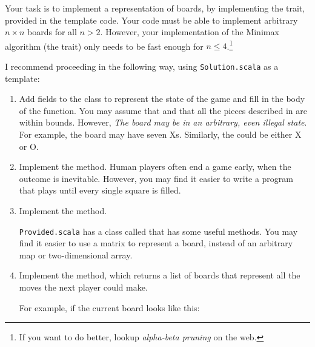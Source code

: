 \documentclass{book}
\begin{document}
Your task is to implement a representation of boards, by implementing
the  trait, provided in the template code.
Your code must be able to implement arbitrary $n \times n$ boards for
all $n > 2$. However, your implementation of the Minimax algorithm
(the  trait) only needs to be fast enough for
 $n \le 4$.\footnote{If you want to do better, lookup \emph{alpha-beta pruning} on the web.}

I recommend proceeding in the following way, using
\texttt{Solution.scala} as a template:

\begin{enumerate}

\item
   Add fields to the  class to represent the state of the game and
   fill in the body of the  function.
   You may assume that  and that all the pieces described
   in  are within bounds. However, \emph{The board may be in an
   arbitrary, even illegal state}. For example, the board may have seven Xs.
   Similarly, the  could be either X or O.


\item Implement the  method. Human players often end a game early,
   when the outcome is inevitable. However, you may find it easier to write a
   program that plays until every single square is filled.


\item Implement the  method.

   \texttt{Provided.scala} has a class called  that
   has some useful methods. You may find it easier to use a matrix to represent
   a board, instead of an arbitrary map or two-dimensional array.

\item Implement the  method, which returns a list of
   boards that represent all the moves the next player could make.

   For example, if the current board looks like this:



\end{enumerate}
\end{document}
